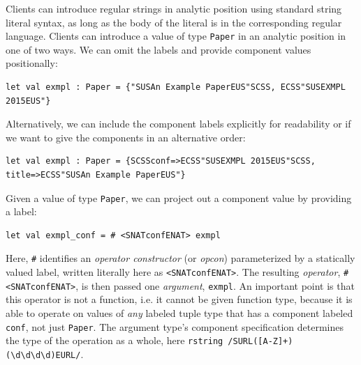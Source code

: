 
Clients can introduce regular strings in analytic position using standard string literal syntax, as long as the body of the literal is in the corresponding regular language. 
Clients can introduce a value of type \lstinline{Paper} in an analytic position in one of two ways. We can omit the labels and provide component values positionally:
\begin{lstlisting}[numbers=none]
let val exmpl : Paper = {"SUSAn Example PaperEUS"SCSS, ECSS"SUSEXMPL 2015EUS"}
\end{lstlisting}
Alternatively, we can include the component labels explicitly for readability or if we want to give the components in an alternative order:
\begin{lstlisting}[numbers=none]
let val exmpl : Paper = {SCSSconf=>ECSS"SUSEXMPL 2015EUS"SCSS, title=>ECSS"SUSAn Example PaperEUS"}
\end{lstlisting}

Given a value of type \lstinline{Paper}, we can project out a component value by providing  a  label:%
\begin{lstlisting}[numbers=none]
let val exmpl_conf = # <SNATconfENAT> exmpl 
\end{lstlisting}
Here, \lstinline{#} identifies an \emph{operator constructor} (or \emph{opcon}) parameterized by a statically valued label, written literally here as \lstinline{<SNATconfENAT>}. The resulting \emph{operator}, \lstinline{# <SNATconfENAT>}, is then passed one \emph{argument}, \lstinline{exmpl}. An important point is that this operator is not a function, i.e. it cannot be given function type, because it is able to operate on values of \emph{any} labeled tuple type that has a component labeled \lstinline{conf}, not just \lstinline{Paper}. The argument type's component specification determines the type of the operation as a whole, here \lstinline{rstring /SURL([A-Z]+) (\d\d\d\d)EURL/}.

